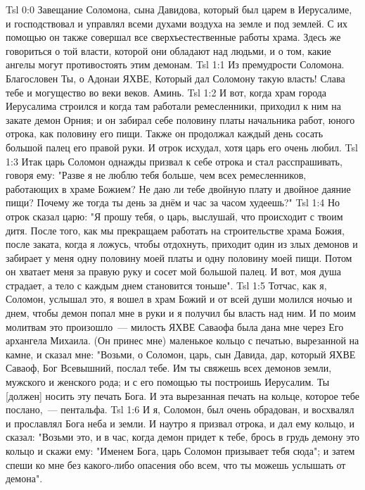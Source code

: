 \vs Tsl 0:0
Завещание Соломона, сына Давидова, который был царем в Иерусалиме, и господствовал и управлял всеми духами воздуха на земле и под землей. С их помощью он также совершал все сверхъестественные работы храма. Здесь же говориться о той власти, которой они обладают над людьми, и о том, какие ангелы могут противостоять этим демонам.
\vs Tsl 1:1 
Из премудрости Соломона. Благословен Ты, о Адонаи ЯХВЕ, Который дал Соломону такую власть! Слава тебе и могущество во веки веков. Аминь.
\vs Tsl 1:2 
И вот, когда храм города Иерусалима строился и когда там работали ремесленники, приходил к ним на закате демон Орния; и он забирал себе половину платы начальника работ, юного отрока, как половину его пищи. Также он продолжал каждый день сосать большой палец его правой руки. И отрок исхудал, хотя царь его очень любил.
\vs Tsl 1:3 
Итак царь Соломон однажды призвал к себе отрока и стал расспрашивать, говоря ему: "Разве я не люблю тебя больше, чем всех ремесленников, работающих в храме Божием? Не даю ли тебе двойную плату и двойное даяние пищи? Почему же тогда ты день за днём и час за часом худеешь?"
\vs Tsl 1:4 
Но отрок сказал царю: "Я прошу тебя, о царь, выслушай, что происходит с твоим дитя. После того, как мы прекращаем работать на строительстве храма Божия, после заката, когда я ложусь, чтобы отдохнуть, приходит один из злых демонов и забирает у меня одну половину моей платы и одну половину моей пищи. Потом он хватает меня за правую руку и сосет мой большой палец. И вот, моя душа страдает, а тело с каждым днем становится тоньше".
\vs Tsl 1:5 
Тотчас, как я, Соломон, услышал это, я вошел в храм Божий и от всей души молился ночью и днем, чтобы демон попал мне в руки и я получил бы власть над ним. И по моим молитвам это произошло~--- милость ЯХВЕ Саваофа была дана мне через Его архангела Михаила. (Он принес мне) маленькое кольцо с печатью, вырезанной на камне, и сказал мне: "Возьми, о Соломон, царь, сын Давида, дар, который ЯХВЕ Саваоф, Бог Всевышний, послал тебе. Им ты свяжешь всех демонов земли, мужского и женского рода; и с его помощью ты построишь Иерусалим. Ты [должен] носить эту печать Бога. И эта вырезанная печать на кольце, которое тебе послано,~--- пентальфа.
\vs Tsl 1:6 
И я, Соломон, был очень обрадован, и восхвалял и прославлял Бога неба и земли. И наутро я призвал отрока, и дал ему кольцо, и сказал: "Возьми это, и в час, когда демон придет к тебе, брось в грудь демону это кольцо и скажи ему: "Именем Бога, царь Соломон призывает тебя сюда"; и затем спеши ко мне без какого-либо опасения обо всем, что ты можешь услышать от демона".
